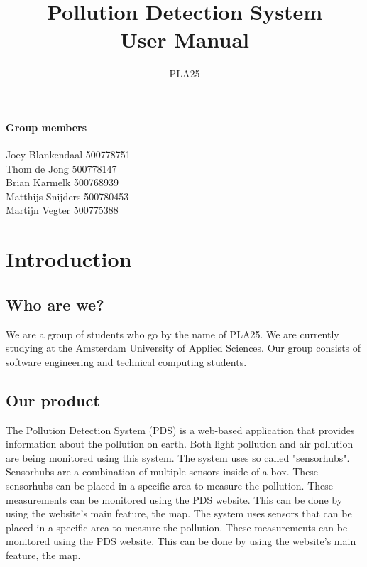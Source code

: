 \documentclass[a4paper]{article}
\title{Pollution Detection System\\User Manual}
\author{PLA25}
\begin{document}
\maketitle
\vspace*{\fill}

\paragraph{Group members}
\begin{tabbing}
	Joey Blankendaal 	\` 	500778751 	\\
	Thom de Jong 		\` 	500778147 	\\
	Brian Karmelk 		\` 	500768939 	\\
	Matthijs Snijders 	\` 	500780453 	\\
	Martijn Vegter 		\` 	500775388
\end{tabbing}

\thispagestyle{empty}
\newpage

\tableofcontents
\newpage

\section{Introduction}

\subsection{Who are we?}
We are a group of students who go by the name of PLA25. We are currently studying at the Amsterdam University of Applied Sciences. Our group consists of software engineering and technical computing students.

\subsection{Our product}
The Pollution Detection System (PDS) is a web-based application that provides information about the pollution on earth. Both light pollution and air pollution are being monitored using this system.
\newline
\newline
The system uses so called "sensorhubs". Sensorhubs are a combination of multiple sensors inside of a box. These sensorhubs can be placed in a specific area to measure the pollution. These measurements can be monitored using the PDS website. This can be done by using the website's main feature, the map.
\newline
\newline
The system uses sensors that can be placed in a specific area to measure the pollution. These measurements can be monitored using the PDS website. This can be done by using the website's main feature, the map.
\end{document}
